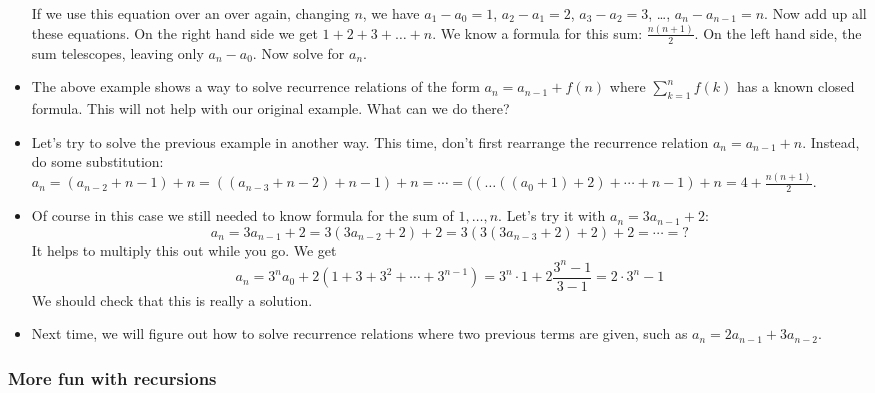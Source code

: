 \begin{itemize}
 If we use this equation over an over again, changing $n$, we have $a_1 - a_0 = 1$, $a_2 - a_1 = 2$, $a_3 - a_2 = 3$, \ldots, $a_n - a_{n-1} = n$.  Now add up all these equations.  On the right hand side we get $1 + 2 + 3 + \ldots + n$.  We know a formula for this sum: $\frac{n(n+1)}{2}$.  On the left hand side, the sum telescopes, leaving only $a_n - a_0$.  Now solve for $a_n$.
 
 \item The above example shows a way to solve recurrence relations of the form $a_n = a_{n-1} + f(n)$ where $\sum_{k = 1}^n f(k)$ has a known closed formula.  This will not help with our original example.  What can we do there?
 
 \item Let's try to solve the previous example in another way.  This time, don't first rearrange the recurrence relation $a_n = a_{n-1} + n$.  Instead, do some substitution: $a_n = (a_{n-2} + n-1) + n = ((a_{n-3} + n-2) + n-1) + n = \cdots = ((\ldots((a_0 + 1) + 2) + \cdots + n-1) + n = 4 + \frac{n(n+1)}{2}$.  
 
 \item Of course in this case we still needed to know formula for the sum of $1,\ldots,n$.  Let's try it with $a_n = 3a_{n-1} + 2$:
 \[a_n = 3a_{n-1} + 2 = 3(3a_{n-2} + 2) + 2 = 3(3(3a_{n-3} + 2) + 2) + 2 = \cdots = ?\]
 It helps to multiply this out while you go.  We get
 \[a_n = 3^n a_0 + 2(1 + 3 + 3^2 + \cdots + 3^{n-1}) = 3^n\cdot 1 + 2\frac{3^n - 1}{3-1} = 2\cdot 3^n - 1 \]
 We should check that this is really a solution.
 
 \item Next time, we will figure out how to solve recurrence relations where two previous terms are given, such as $a_n = 2 a_{n-1} + 3 a_{n-2}$.
\end{itemize}



\subsubsection*{More fun with recursions}

